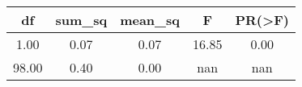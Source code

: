 \begin{tabular}{|c|c|c|c|c|}
\toprule
   df &  sum\_sq &  mean\_sq &     F &  PR(>F) \\
\midrule
 1.00 &    0.07 &     0.07 & 16.85 &    0.00 \\
98.00 &    0.40 &     0.00 &   nan &     nan \\
\bottomrule
\end{tabular}
